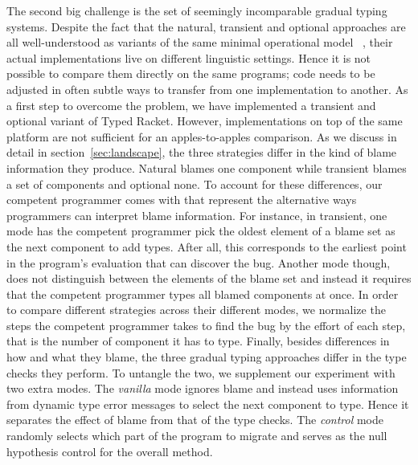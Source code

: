 The second big challenge is the set of seemingly incomparable gradual
typing systems. Despite the fact that the natural, transient and optional
approaches are all well-understood as variants of the same minimal operational model
~\cite{gf-icfp-2018, gfd-oopsla-2019}, their actual implementations live on
different linguistic settings. Hence it is not possible to compare them directly 
on the same programs; code needs to be adjusted in often subtle ways to
transfer from one implementation to another. As a first step to overcome the problem, 
we have implemented a transient and optional variant of Typed Racket.  
However,
implementations on top of the same platform are not sufficient for an
apples-to-apples comparison. As we discuss in detail in
section~\ref{sec:landscape}, the three strategies differ in the kind of
blame information they produce. Natural blames one component while
transient blames a set of components and optional none. To account for these
differences, our competent programmer comes with  that represent 
the alternative ways programmers can interpret blame information. For instance, in
transient, one mode  has the competent programmer pick the oldest element of a blame set 
as the next component to add types. After all, this corresponds to the
earliest point in the program's evaluation that can discover the bug. 
Another mode though, does not distinguish between the elements of the
blame set and instead it requires that the competent programmer types 
all blamed components at once. In order to compare different strategies
across their different modes, we normalize the steps the competent
programmer takes to find the bug by the effort of each step, that is the
number of component it has to type. Finally, besides differences in how
and what they blame, the three gradual typing approaches differ in the type checks they perform. 
To untangle the two, we supplement our experiment with two extra modes. The \emph{vanilla} mode
ignores blame and instead uses information from dynamic type error messages to
select the next component to type. Hence it separates the effect of blame 
from that of the type checks. The \emph{control} mode randomly
selects which part of the program to migrate and serves as the null hypothesis
control for the overall method.

